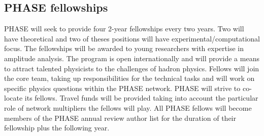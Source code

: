 \subsection{PHASE fellowships}
\label{sec:fellowships}
PHASE will seek to provide four 2-year fellowships every two years. Two will have theoretical and two of theses positions will have experimental/computational focus. The fellowships will be awarded to young researchers with expertise in amplitude analysis. The program is open internationally and will provide a means to attract talented physicists to the challenges of hadron physics. Fellows will join the core team, taking up responsibilities for the technical tasks and will work on specific physics questions within the PHASE network. PHASE will strive to co-locate its fellows. Travel funds will be provided taking into account the particular role of network multipliers the fellows will play. All PHASE fellows will become members of the PHASE annual review author list for the duration of their fellowship plus the following year.     
